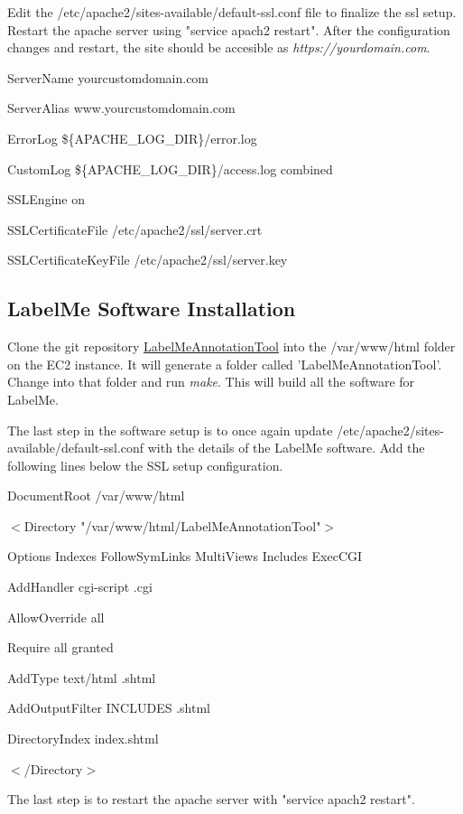\documentclass[a4paper]{article}
\begin{document}
Edit the /etc/apache2/sites-available/default-ssl.conf file to finalize the ssl setup. Restart the apache server using "service apach2 restart". After the configuration changes and restart, the site should be accesible as \textit{https://yourdomain.com}.

\bigskip

		ServerName yourcustomdomain.com
		
		ServerAlias www.yourcustomdomain.com

		ErrorLog \$\{APACHE\_LOG\_DIR\}/error.log
		
		CustomLog \$\{APACHE\_LOG\_DIR\}/access.log combined

		SSLEngine on
		
		SSLCertificateFile /etc/apache2/ssl/server.crt
		
        SSLCertificateKeyFile /etc/apache2/ssl/server.key

\subsection{LabelMe Software Installation}

Clone the git repository \href{https://github.com/CSAILVision/LabelMeAnnotationTool}{LabelMeAnnotationTool} into the /var/www/html folder on the EC2 instance. It will generate a folder called 'LabelMeAnnotationTool'. Change into that folder and run \textit{make}. This will build all the software for LabelMe. 

The last step in the software setup is to once again update /etc/apache2/sites-available/default-ssl.conf with the details of the LabelMe software. Add the following lines below the SSL setup configuration. 
\bigskip


DocumentRoot /var/www/html

$<$Directory "/var/www/html/LabelMeAnnotationTool"$>$

			Options Indexes FollowSymLinks MultiViews Includes ExecCGI
			
			AddHandler cgi-script .cgi
			
			AllowOverride all
			
			Require all granted
			
			AddType text/html .shtml
			
			AddOutputFilter INCLUDES .shtml
			
			DirectoryIndex index.shtml
			
$<$/Directory$>$

\bigskip

The last step is to restart the apache server with "service apach2 restart". 
\end{document}
